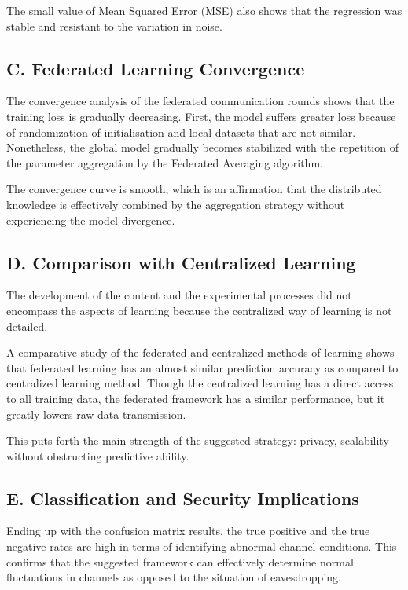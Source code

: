 \documentclass[conference]{IEEEtran}
\begin{document}
The small value of Mean Squared Error (MSE) also shows that the regression was stable and resistant to the variation in noise. 

\subsection*{C. Federated Learning Convergence}

The convergence analysis of the federated communication rounds shows that the training loss is gradually decreasing. First, the model suffers greater loss because of randomization of initialisation and local datasets that are not similar. Nonetheless, the global model gradually becomes stabilized with the repetition of the parameter aggregation by the Federated Averaging algorithm. 

The convergence curve is smooth, which is an affirmation that the distributed knowledge is effectively combined by the aggregation strategy without experiencing the model divergence. 

\subsection*{D. Comparison with Centralized Learning}

 The development of the content and the experimental processes did not encompass the aspects of learning because the centralized way of learning is not detailed.
 
 A comparative study of the federated and centralized methods of learning shows that federated learning has an almost similar prediction accuracy as compared to centralized learning method. Though the centralized learning has a direct access to all training data, the federated framework has a similar performance, but it greatly lowers raw data transmission.
 
 This puts forth the main strength of the suggested strategy: privacy, scalability without obstructing predictive ability. 
\subsection*{E. Classification and Security Implications}

Ending up with the confusion matrix results, the true positive and the true negative rates are high in terms of identifying abnormal channel conditions. This confirms that the suggested framework can effectively determine normal fluctuations in channels as opposed to the situation of eavesdropping.
\end{document}
